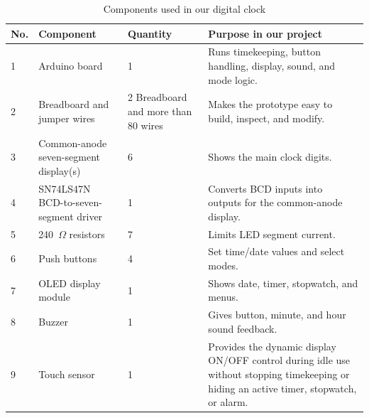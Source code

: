\documentclass[12pt,letterpaper]{article}
\begin{document}
\begin{table}[H]

  \centering

  \caption{Components used in our digital clock}

  \label{tab:components}

  \begin{tabularx}{
    \textwidth
  }{
    @{}p{9mm}Yp{24mm}Y@{}
  }

    \toprule

    \textbf{No.}
    &
    \textbf{Component}
    &
    \textbf{Quantity}
    &
    \textbf{Purpose in our project}
    \\

    \midrule

    1
    &
    Arduino board
    &
    1
    &
    Runs timekeeping,
    button handling,
    display,
    sound,
    and mode logic.
    \\

    2
    &
    Breadboard and jumper wires
    &
    2 Breadboard and more than 80 wires
    &
    Makes the prototype easy to build,
    inspect, and modify.
    \\

    3
    &
    Common-anode seven-segment display(s)
    &
    6
    &
    Shows the main clock digits.
    \\

    4
    &
    SN74LS47N BCD-to-seven-segment driver
    &
    1
    &
    Converts BCD inputs into outputs
    for the common-anode display.
    \\

    5
    &
    240~$\Omega$ resistors
    &
    7
    &
    Limits LED segment current.
    \\

    6
    &
    Push buttons
    &
    4
    &
    Set time/date values
    and select modes.
    \\

    7
    &
    OLED display module
    &
    1
    &
    Shows date,
    timer,
    stopwatch,
    and menus.
    \\

    8
    &
    Buzzer
    &
    1
    &
    Gives button,
    minute,
    and hour sound feedback.
    \\

    9
    &
    Touch sensor
    &
    1
    &
    Provides the dynamic display ON/OFF control during idle use
    without stopping timekeeping or hiding an active timer,
    stopwatch, or alarm.
    \\


\end{tabularx}
\end{table}
\end{document}
